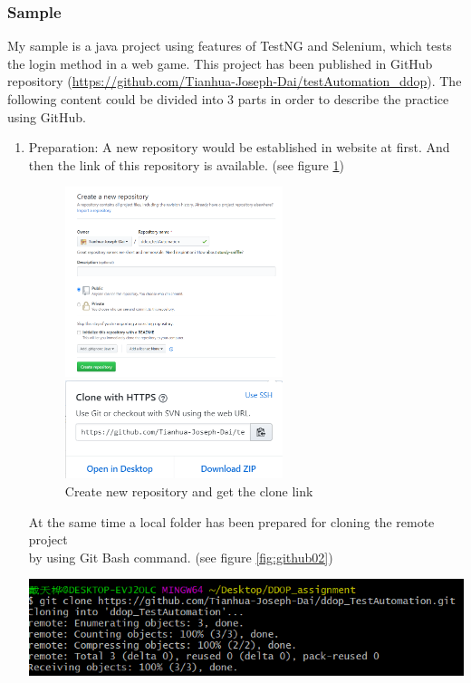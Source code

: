 \documentclass[12pt,a4paper,bibliography=totocnumbered,listof=totocnumbered]{article}
\begin{document}
\subsubsection{Sample}
My sample is a java project using features of TestNG and Selenium, which tests the login method in a web game.
This project has been published in GitHub repository (\url{https://github.com/Tianhua-Joseph-Dai/testAutomation_ddop}).
The following content could be divided into 3 parts in order to describe the practice using GitHub.
\begin{enumerate}
	\item Preparation: A new repository would be established in website at first. And then the link of this repository is available. (see figure \ref{fig:github01})
	\begin{figure}[H] 
		\begin{minipage}[t]{0.5\linewidth} 
		\centering 
		\includegraphics[width=2.5in]{pics/createNewOnline.png}  
		\end{minipage}%
		\begin{minipage}[t]{0.5\linewidth} 
		\centering 
		\includegraphics[width=2.5in]{pics/getUrl.png} 
		\end{minipage} %
		\caption{Create new repository and get the clone link}
		\label{fig:github01}
	\end{figure} %
	\newpage
	At the same time a local folder has been prepared for cloning the remote project\\ by using Git Bash command. (see figure \ref{fig:github02})\\ 
	\begin{minipage}{\linewidth}
		\centering
		\includegraphics[width=0.5\linewidth]{pics/gitClone.png}

\end{minipage}
\end{enumerate}
\end{document}
